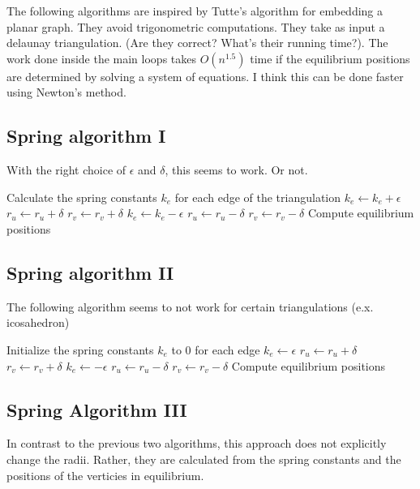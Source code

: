 \documentclass{article}
\begin{document}
The following algorithms are inspired by Tutte's algorithm for embedding a planar graph. They avoid trigonometric computations. They take as input a delaunay triangulation. (Are they correct? What's their running time?). The work done inside the main loops takes $O(n^{1.5})$ time if the equilibrium positions are determined by solving a system of equations. I think this can be done faster using Newton's method.

\subsection{Spring algorithm I}

With the right choice of $\epsilon$ and $\delta$, this seems to work. Or not.\\

\begin{algorithmic}
\State Calculate the spring constants $k_e$ for each edge of the triangulation
						\State $k_e\gets k_e + \epsilon$
						\State $r_u\gets r_u + \delta$
						\State $r_v\gets r_v + \delta$
						\State $k_e\gets k_e - \epsilon$
						\State $r_u\gets r_u - \delta$
						\State $r_v\gets r_v - \delta$
				\EndIf
		\EndFor
		\State Compute equilibrium positions
\EndWhile
\end{algorithmic}

\subsection{Spring algorithm II}
The following algorithm seems to not work for certain triangulations (e.x. icosahedron) \\

\begin{algorithmic}
\State Initialize the spring constants $k_e$ to 0 for each edge
						\State $k_e\gets \epsilon$
						\State $r_u\gets r_u + \delta$
						\State $r_v\gets r_v + \delta$
						\State $k_e\gets -\epsilon$
						\State $r_u\gets r_u - \delta$
						\State $r_v\gets r_v - \delta$
				\EndIf
		\EndFor
		\State Compute equilibrium positions
\EndWhile
\end{algorithmic}	

\subsection{Spring Algorithm III}
In contrast to the previous two algorithms, this approach does not explicitly change the radii. Rather, they are calculated from the spring constants and the positions of the verticies in equilibrium.
\end{document}
